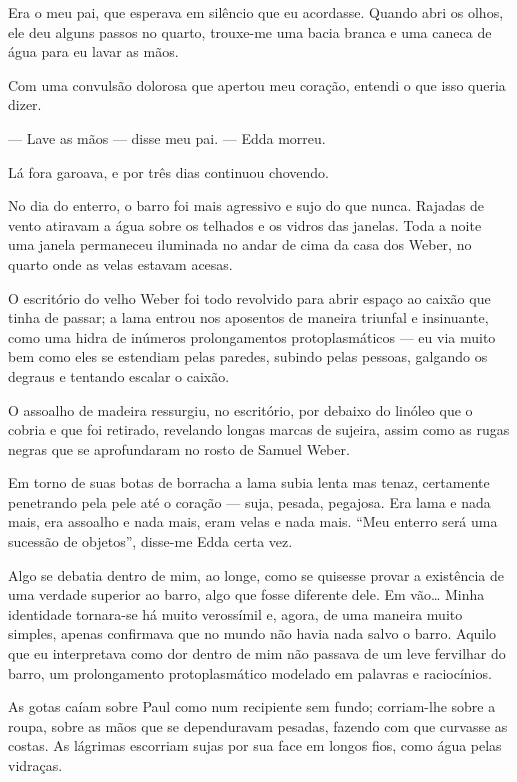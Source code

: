 Era o meu pai, que esperava em silêncio que eu acordasse. Quando abri os
olhos, ele deu alguns passos no quarto, trouxe-me uma bacia branca e uma
caneca de água para eu lavar as mãos.

Com uma convulsão dolorosa que apertou meu coração, entendi o que isso queria
dizer.

--- Lave as mãos --- disse meu pai. --- Edda morreu.

Lá fora garoava, e por três dias continuou chovendo.

No dia do enterro, o barro foi mais agressivo e sujo do que nunca. Rajadas de
vento atiravam a água sobre os telhados e os vidros das janelas. Toda a noite
uma janela permaneceu iluminada no andar de cima da casa dos Weber, no quarto
onde as velas estavam acesas.

O escritório do velho Weber foi todo revolvido para abrir espaço ao caixão que
tinha de passar; a lama entrou nos aposentos de maneira triunfal e
insinuante, como uma hidra de inúmeros prolongamentos protoplasmáticos --- eu
via muito bem como eles se estendiam pelas paredes, subindo pelas pessoas,
galgando os degraus e tentando escalar o caixão.

O assoalho de madeira ressurgiu, no escritório, por debaixo do linóleo que o
cobria e que foi retirado, revelando longas marcas de sujeira, assim como as
rugas negras que se aprofundaram no rosto de Samuel Weber.

Em torno de suas botas de borracha a lama subia lenta mas tenaz, certamente
penetrando pela pele até o coração --- suja, pesada, pegajosa. Era lama e
nada mais, era assoalho e nada mais, eram velas e nada mais. ``Meu enterro
será uma sucessão de objetos'', disse-me Edda certa vez.

Algo se debatia dentro de mim, ao longe, como se quisesse provar a existência
de uma verdade superior ao barro, algo que fosse diferente dele. Em vão\ldots
{} Minha identidade tornara-se há muito verossímil e, agora, de uma maneira
muito simples, apenas confirmava que no mundo não havia nada salvo o barro.
Aquilo que eu interpretava como dor dentro de mim não passava de um leve
fervilhar do barro, um prolongamento protoplasmático modelado em palavras e
raciocínios.

As gotas caíam sobre Paul como num recipiente sem fundo; corriam-lhe sobre a
roupa, sobre as mãos que se dependuravam pesadas, fazendo com que curvasse as
costas. As lágrimas escorriam sujas por sua face em longos fios, como água
pelas vidraças.

